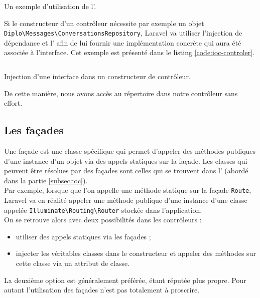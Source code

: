 		\begin{listing}[H]
			\inputminted[fontsize=\small]{php}{code/iocContainer.php}
			\caption{Un exemple d'utilisation de l'\ioc{}.}
			\label{code:ioc-container}
		\end{listing}

		Si le constructeur d'un contrôleur nécessite par exemple un objet \verb|Diplo\Messages\ConversationsRepository|, Laravel va utiliser l'injection de dépendance et l'\ioc{} afin de lui fournir une implémentation concrète qui aura été associée à l'interface. Cet exemple est présenté dans le listing \ref{code:ioc-controler}.
		\begin{listing}[H]
			\inputminted[fontsize=\small]{php}{code/injectionClass.php}
			\caption{Injection d'une interface dans un constructeur de contrôleur.}
			\label{code:ioc-controler}
		\end{listing}

		De cette manière, nous avons accès au répertoire dans notre contrôleur sans effort.

	\subsection{Les façades}
		Une façade est une classe spécifique qui permet d'appeler des méthodes publiques d'une instance d'un objet via des appels statiques sur la façade. Les classes qui peuvent être résolues par des façades sont celles qui se trouvent dans l'\ioc{} (abordé dans la partie \ref{subsec:ioc}).\\

		Par exemple, lorsque que l'on appelle une méthode statique sur la façade \verb|Route|, Laravel va en réalité appeler une méthode publique d'une instance d'une classe appelée \verb|Illuminate\Routing\Router| stockée dans l'application.\\

		On se retrouve alors avec deux possibilités dans les contrôleurs :
		\begin{itemize}
			\item utiliser des appels statiques via les façades ;
			\item injecter les véritables classes dans le constructeur et appeler des méthodes sur cette classe via un attribut de classe.
		\end{itemize}
		\vspace{10px}
		La deuxième option est généralement préférée, étant réputée plus propre. Pour autant l'utilisation des façades n'est pas totalement à proscrire.

